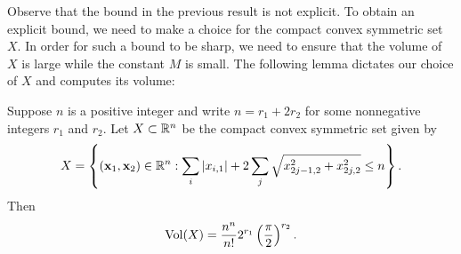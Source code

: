     Observe that the bound in the previous result is not explicit. To obtain an explicit bound, we need to make a choice for the compact convex symmetric set \(X\). In order for such a bound to be sharp, we need to ensure that the volume of \(X\) is large while the constant \(M\) is small. The following lemma dictates our choice of \(X\) and computes its volume:

    \begin{lemma}\label{lem:Minkowski_bound_lemma}
      Suppose \(n\) is a positive integer and write \(n = r_{1}+2r_{2}\) for some nonnegative integers \(r_{1}\) and \(r_{2}\). Let \(X \subset \mathbb{R}^{n}\) be the compact convex symmetric set given by
      \[
        X = \left\{(\mathbf{x}_{1},\mathbf{x}_{2}) \in \mathbb{R}^{n}:\sum_{i}|x_{i,1}|+2\sum_{j}\sqrt{x_{2j-1,2}^{2}+x_{2j,2}^{2}} \le n\right\}.
      \]
      Then
      \[
        \operatorname{\mathrm{Vol}}(X) = \frac{n^{n}}{n!}2^{r_{1}}\left(\frac{\pi}{2}\right)^{r_{2}}.
      \]
    \end{lemma}
